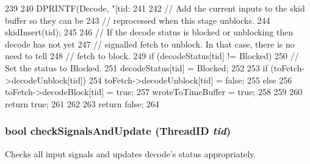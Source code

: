 \begin{DoxyCode}
239 {
240     DPRINTF(Decode, "[tid:%
241 
242     // Add the current inputs to the skid buffer so they can be
243     // reprocessed when this stage unblocks.
244     skidInsert(tid);
245 
246     // If the decode status is blocked or unblocking then decode has not yet
247     // signalled fetch to unblock. In that case, there is no need to tell
248     // fetch to block.
249     if (decodeStatus[tid] != Blocked) {
250         // Set the status to Blocked.
251         decodeStatus[tid] = Blocked;
252 
253         if (toFetch->decodeUnblock[tid]) {
254             toFetch->decodeUnblock[tid] = false;
255         } else {
256             toFetch->decodeBlock[tid] = true;
257             wroteToTimeBuffer = true;
258         }
259 
260         return true;
261     }
262 
263     return false;
264 }
\end{DoxyCode}
\hypertarget{classDefaultDecode_af77f2bf38a75182c65e633b9fdf295d2}{
\subsubsection[{checkSignalsAndUpdate}]{\setlength{\rightskip}{0pt plus 5cm}bool checkSignalsAndUpdate ({\bf ThreadID} {\em tid})}}
\label{classDefaultDecode_af77f2bf38a75182c65e633b9fdf295d2}
Checks all input signals and updates decode's status appropriately. 


